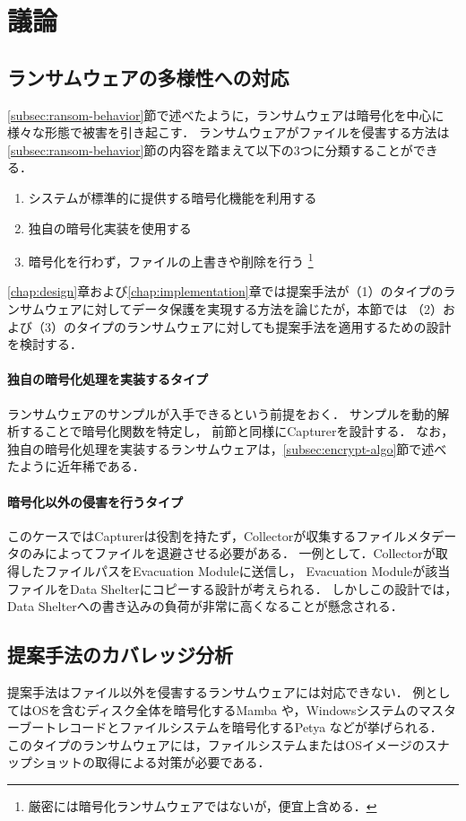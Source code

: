 \chapter{議論}
\section{ランサムウェアの多様性への対応}
\ref{subsec:ransom-behavior}節で述べたように，ランサムウェアは暗号化を中心に様々な形態で被害を引き起こす．
ランサムウェアがファイルを侵害する方法は\ref{subsec:ransom-behavior}節の内容を踏まえて以下の3つに分類することができる．
\begin{enumerate}
  \item システムが標準的に提供する暗号化機能を利用する
  \item 独自の暗号化実装を使用する
  \item 暗号化を行わず，ファイルの上書きや削除を行う \footnote{厳密には暗号化ランサムウェアではないが，便宜上含める．}
\end{enumerate}
\ref{chap:design}章および\ref{chap:implementation}章では提案手法が（1）のタイプのランサムウェアに対してデータ保護を実現する方法を論じたが，本節では
（2）および（3）のタイプのランサムウェアに対しても提案手法を適用するための設計を検討する．

\subsubsection{独自の暗号化処理を実装するタイプ}
ランサムウェアのサンプルが入手できるという前提をおく．
サンプルを動的解析することで暗号化関数を特定し，
前節と同様にCapturerを設計する．
なお，独自の暗号化処理を実装するランサムウェアは，\ref{subsec:encrypt-algo}節で述べたように近年稀である．


\subsubsection{暗号化以外の侵害を行うタイプ}
このケースではCapturerは役割を持たず，Collectorが収集するファイルメタデータのみによってファイルを退避させる必要がある．
一例として．Collectorが取得したファイルパスをEvacuation Moduleに送信し，
Evacuation Moduleが該当ファイルをData Shelterにコピーする設計が考えられる．
しかしこの設計では，Data Shelterへの書き込みの負荷が非常に高くなることが懸念される．


\section{提案手法のカバレッジ分析}
提案手法はファイル以外を侵害するランサムウェアには対応できない．
例としてはOSを含むディスク全体を暗号化するMamba \cite{mamba-petya} や，Windowsシステムのマスターブートレコードとファイルシステムを暗号化するPetya \cite{mamba-petya} などが挙げられる．
このタイプのランサムウェアには，ファイルシステムまたはOSイメージのスナップショットの取得による対策が必要である．


